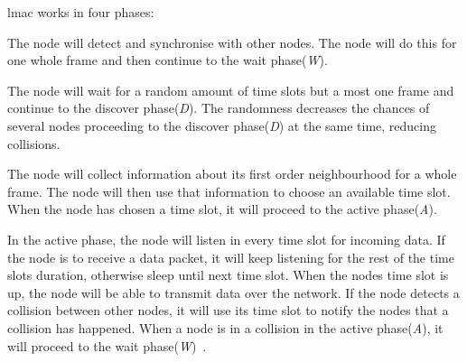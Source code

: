  
\gls{lmac} works in four phases:
\begin{description}[style=nextline]
    \item[Initialisation phase(\textit{I})] The node will detect and synchronise with other nodes. The node will do this for one whole frame and then continue to the wait phase(\textit{W}).
    
    \item[Wait phase(\textit{W})] The node will wait for a random amount of time slots but a most one frame and continue to the discover phase(\textit{D}). The randomness decreases the chances of several nodes proceeding to the discover phase(\textit{D}) at the same time, reducing collisions.
    
    \item[Discover phase(\textit{D})] The node will collect information about its first order neighbourhood for a whole frame. The node will then use that information to choose an available time slot. When the node has chosen a time slot, it will proceed to the active phase(\textit{A}).
    
    \item[Active phase(\textit{A})] In the active phase, the node will listen in every time slot for incoming data. If the node is to receive a data packet, it will keep listening for the rest of the time slots duration, otherwise sleep until next time slot. When the nodes time slot is up, the node will be able to transmit data over the network. If the node detects a collision between other nodes, it will use its time slot to notify the nodes that a collision has happened. When a node is in a collision in the active phase(\textit{A}), it will proceed to the wait phase(\textit{W})~\cite[p.~3-4]{paper:lmac_verification}. 
\end{description}